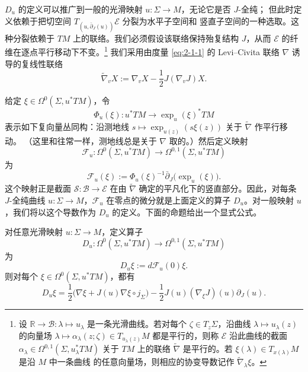 $D_u$ 的定义可以推广到一般的光滑映射 $u:\Sigma\to M$，无论它是否 $J$-全纯；
但此时定义依赖于把切空间 $T_{(u,\bar\partial_J(u))}\mathcal E$ 分裂为水平子空间和
竖直子空间的一种选取。这种分裂依赖于 $TM$ 上的联络。我们必须假设该联络保持殆复结构
$J$，从而 $\mathcal E$ 的纤维在逐点平行移动下不变。\footnote{设
$\mathbb R\to\mathcal B:\lambda\mapsto u_\lambda$ 是一条光滑曲线。若对每个
$\zeta\in T_z\Sigma$，沿曲线 $\lambda\mapsto u_\lambda(z)$ 的向量场
$\lambda\mapsto\alpha_\lambda(z;\zeta)\in T_{u_\lambda(z)}M$ 都是平行的，则称
$\mathcal E$ 沿此曲线的截面
$\alpha_\lambda\in\Omega^{0,1}(\Sigma,u_\lambda^*TM)$ 关于 $TM$ 上的联络
$\widetilde\nabla$ 是平行的。若 $\xi(\lambda)\in T_{x(\lambda)}M$ 是沿 $M$ 中一条曲线
的任意向量场，则相应的协变导数记作 $\widetilde\nabla_\lambda\xi$。}
我们采用由度量 \eqref{eq:2-1-1} 的 Levi--Civita 联络 $\nabla$ 诱导的复线性联络
\[
  \widetilde\nabla_vX
  :=\nabla_vX-\frac12J(\nabla_vJ)X.
\]

给定 $\xi\in\Omega^0(\Sigma,u^*TM)$，令
\[
  \Phi_u(\xi):u^*TM\longrightarrow\exp_u(\xi)^*TM
\]
表示如下复向量丛同构：沿测地线
$s\mapsto\exp_{u(z)}(s\xi(z))$ 关于 $\widetilde\nabla$ 作平行移动。
（这里和往常一样，测地线总是关于 $\nabla$ 取的。）然后定义映射
\[
  \mathcal F_u:\Omega^0(\Sigma,u^*TM)
  \longrightarrow\Omega^{0,1}(\Sigma,u^*TM)
\]
为
\begin{equation}\label{eq:3-1-3}
  \mathcal F_u(\xi)
  :=\Phi_u(\xi)^{-1}\bar\partial_J\bigl(\exp_u(\xi)\bigr).
\end{equation}
这个映射正是截面 $\mathcal S:\mathcal B\to\mathcal E$ 在由
$\widetilde\nabla$ 确定的平凡化下的竖直部分。因此，对每条 $J$-全纯曲线
$u:\Sigma\to M$，$\mathcal F_u$ 在零点的微分就是上面定义的算子 $D_u$。对一般映射
$u$，我们将以这个导数作为 $D_u$ 的定义。下面的命题给出一个显式公式。

\begin{proposition}\label{prop:3-1-1}
对任意光滑映射 $u:\Sigma\to M$，定义算子
\[
  D_u:\Omega^0(\Sigma,u^*TM)\longrightarrow\Omega^{0,1}(\Sigma,u^*TM)
\]
为
\[
  D_u\xi:=d\mathcal F_u(0)\xi.
\]
则对每个 $\xi\in\Omega^0(\Sigma,u^*TM)$，都有
\begin{equation}\label{eq:3-1-4}
  D_u\xi
  =\frac12\bigl(\nabla\xi+J(u)\nabla\xi\circ j_\Sigma\bigr)
  -\frac12J(u)(\nabla_\xi J)(u)\partial_J(u).
\end{equation}
\end{proposition}

